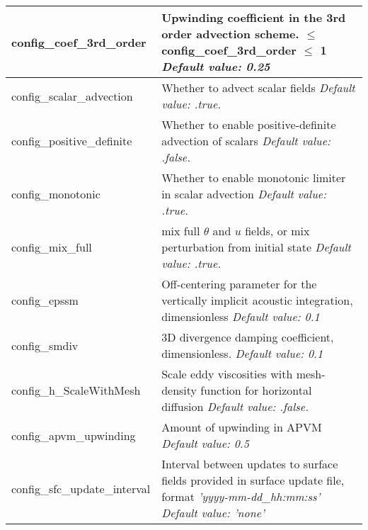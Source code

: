 {\begin{longtable}{|p{1.75in} |p{4.5in}|}
   config\_coef\_3rd\_order & Upwinding coefficient in the 3rd order advection scheme. \hfill\break 0 $\le$ config\_coef\_3rd\_order $\le$ 1 \newline 
   {\em Default value: 0.25} \\ \hline
   
   config\_scalar\_advection & Whether to advect scalar fields \newline 
   {\em Default value: .true.} \\ \hline   

   config\_positive\_definite & Whether to enable positive-definite advection of scalars \newline 
   {\em Default value: .false.} \\ \hline

   config\_monotonic & Whether to enable monotonic limiter in scalar advection \newline 
   {\em Default value: .true.} \\ \hline

   config\_mix\_full & mix full $\theta$ and $u$ fields, or mix perturbation from initial state \newline 
   {\em Default value: .true.} \\ \hline   
      
   config\_epssm & Off-centering parameter for the vertically implicit acoustic \hfill \break integration, dimensionless \newline 
   {\em Default value: 0.1} \\ \hline

   config\_smdiv & 3D divergence damping coefficient, dimensionless. \newline 
   {\em Default value: 0.1} \\ \hline

   config\_h\_ScaleWithMesh & Scale eddy viscosities with mesh-density function for horizontal diffusion \newline 
   {\em Default value: .false.} \\ \hline
   
   config\_apvm\_upwinding & Amount of upwinding in APVM \newline 
   {\em Default value: 0.5} \\ \hline   

   config\_sfc\_update\_interval & Interval between updates to surface fields provided in surface update file, 
   format {\em 'yyyy-mm-dd\_hh:mm:ss'} \newline 
   {\em Default value: 'none'} \\ \hline

\end{longtable}
}

